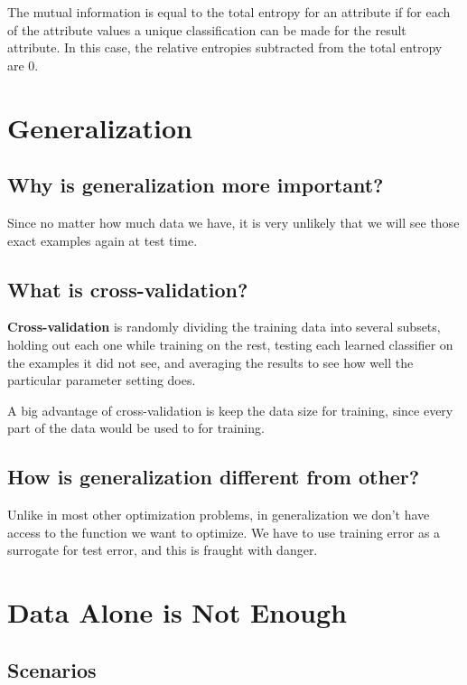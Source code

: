 \documentclass[12pt]{article}
\begin{document}
The mutual information is equal to the total entropy for an attribute if for
each of the attribute values a unique classification can be made for the result
attribute. In this case, the relative entropies subtracted from the total
entropy are 0.

\section{Generalization}

\subsection{Why is generalization more important?}

Since no matter how much data we have, it is very unlikely that we will see
those exact examples again at test time.

\subsection{What is cross-validation? }

\textbf{Cross-validation} is randomly dividing the training data into several
subsets, holding out each one while training on the rest, testing each learned
classifier on the examples it did not see, and averaging the results to see how
well the particular parameter setting does.

A big advantage of cross-validation is keep the data size for training, since
every part of the data would be used to for training.

\subsection{How is generalization different from other?}

Unlike in most other optimization problems, in generalization we don’t have
access to the function we want to optimize. We have to use training error as a
surrogate for test error, and this is fraught with danger.

\section{Data Alone is Not Enough}

\subsection{Scenarios}
\end{document}
